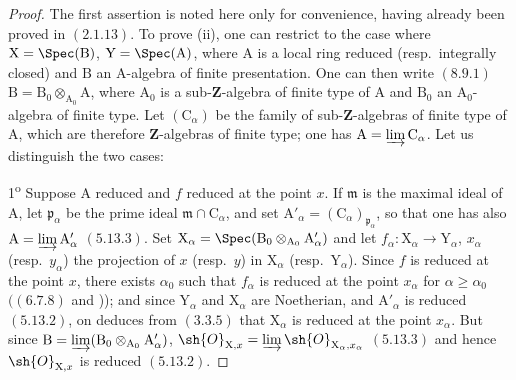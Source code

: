 \begin{proof}
The first assertion is noted here only for convenience, having already been proved in $(2.1.13)$. To prove (ii), one can restrict to the case where $\mathrm{X}=\Spec(\mathrm{B})$, $\mathrm{Y}=\Spec(\mathrm{A})$, where $\mathrm{A}$ is a local ring reduced (resp.\ integrally closed) and $\mathrm{B}$ an A-algebra of finite presentation. One can then write $(8.9.1)$ $\mathrm{B}=\mathrm{B}_0\otimes_{\mathrm{A}_0}\mathrm{A}$, where $\mathrm{A}_0$ is a sub-$\mathbf{Z}$-algebra of finite type of $\mathrm{A}$ and $\mathrm{B}_0$ an $\mathrm{A}_0$-algebra of finite type. Let $(\mathrm{C}_\alpha)$ be the family of sub-$\mathbf{Z}$-algebras of finite type of $\mathrm{A}$, which are therefore $\mathbf{Z}$-algebras of finite type; one has $\mathrm{A}=\varinjlim\mathrm{C}_\alpha$. Let us distinguish the two cases:

1\textsuperscript{o} Suppose $\mathrm{A}$ reduced and $f$ reduced at the point $x$. If $\mathfrak{m}$ is the maximal ideal of $\mathrm{A}$, let $\mathfrak{p}_\alpha$ be the prime ideal $\mathfrak{m}\cap\mathrm{C}_\alpha$, and set $\mathrm{A}'_\alpha=(\mathrm{C}_\alpha)_{\mathfrak{p}_\alpha}$, so that one has also $\mathrm{A}=\varinjlim\mathrm{A}'_\alpha$ $(5.13.3)$. Set $\mathrm{X}_\alpha=\Spec(\mathrm{B}_0\otimes_{\mathrm{A}_0}\mathrm{A}'_\alpha)$ and let $f_\alpha:\mathrm{X}_\alpha\to\mathrm{Y}_\alpha$, $x_\alpha$ (resp.\ $y_\alpha$) the projection of $x$ (resp.\ $y$) in $\mathrm{X}_\alpha$ (resp.\ $\mathrm{Y}_\alpha$). Since $f$ is reduced at the point $x$, there exists $\alpha_0$ such that $f_\alpha$ is reduced at the point $x_\alpha$ for $\alpha\geqslant\alpha_0$ $((6.7.8)$ and )); and since $\mathrm{Y}_\alpha$ and $\mathrm{X}_\alpha$ are Noetherian, and $\mathrm{A}'_\alpha$ is reduced $(5.13.2)$, on deduces from $(3.3.5)$ that $\mathrm{X}_\alpha$ is reduced at the point $x_\alpha$. But since $\mathrm{B}=\varinjlim(\mathrm{B}_0\otimes_{\mathrm{A}_0}\mathrm{A}'_\alpha)$, $\sh{O}_{\mathrm{X},x}=\varinjlim\sh{O}_{\mathrm{X}_\alpha,x_\alpha}$ $(5.13.3)$ and hence $\sh{O}_{\mathrm{X},x}$ is reduced $(5.13.2)$.


\end{proof}

